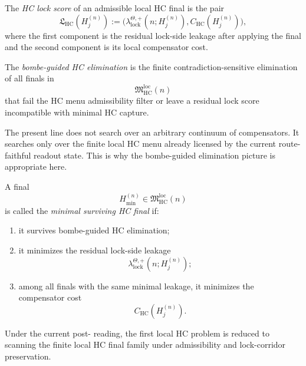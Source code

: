 \begin{definition}
\label{def:hc-lock-score}
The \emph{HC lock score} of an admissible local HC final is the pair
\[
 \mathfrak L_{\mathrm{HC}}(H_j^{(n)})
 :=
 \bigl(
 \lambda_{\mathrm{lock}}^{\Theta,+}(n;H_j^{(n)}),
 C_{\mathrm{HC}}(H_j^{(n)})
 \bigr),
\]
where the first component is the residual lock-side leakage after applying the final and the second component is its local compensator cost.
\end{definition}

\begin{definition}
\label{def:bombe-guided-hc-elimination}
The \emph{bombe-guided HC elimination} is the finite contradiction-sensitive elimination of all finals in
\[
 \mathfrak M_{\mathrm{HC}}^{\mathrm{loc}}(n)
\]
that fail the HC menu admissibility filter or leave a residual lock score incompatible with minimal HC capture.
\end{definition}

\begin{remark}
\label{rem:why-the-hc-scan-is-finite}
The present line does not search over an arbitrary continuum of compensators. It searches only over the finite local HC menu already licensed by the current route-faithful readout state. This is why the bombe-guided elimination picture is appropriate here.
\end{remark}

\begin{definition}
\label{def:minimal-surviving-hc-final}
A final
\[
 H_{\min}^{(n)}\in \mathfrak M_{\mathrm{HC}}^{\mathrm{loc}}(n)
\]
is called the \emph{minimal surviving HC final} if:
\begin{enumerate}[leftmargin=2em,label=(\alph*)]
 \item it survives bombe-guided HC elimination;
 \item it minimizes the residual lock-side leakage
 \[
 \lambda_{\mathrm{lock}}^{\Theta,+}(n;H_j^{(n)});
 \]
 \item among all finals with the same minimal leakage, it minimizes the compensator cost
 \[
 C_{\mathrm{HC}}(H_j^{(n)}).
 \]
\end{enumerate}
\end{definition}

\begin{proposition}
\label{prop:current-line-reduces-hc-to-finite-menu-scan}
Under the current post- reading, the first local HC problem is reduced to scanning the finite local HC final family under admissibility and lock-corridor preservation.
\end{proposition}

